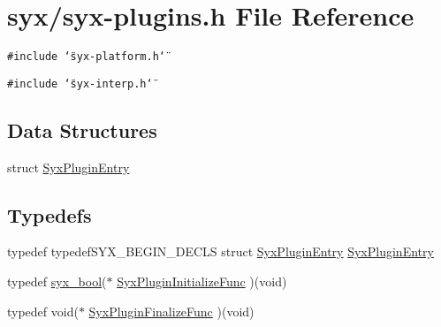 \hypertarget{syx-plugins_8h}{
\section{syx/syx-plugins.h File Reference}
\label{syx-plugins_8h}
}
{\tt \#include \char`\"{}syx-platform.h\char`\"{}}\par
{\tt \#include \char`\"{}syx-interp.h\char`\"{}}\par
\subsection*{Data Structures}
\begin{CompactItemize}
\item 
struct \hyperlink{struct_syx_plugin_entry}{SyxPluginEntry}
\end{CompactItemize}
\subsection*{Typedefs}
\begin{CompactItemize}
\item 
typedef typedefSYX\_\-BEGIN\_\-DECLS struct \hyperlink{struct_syx_plugin_entry}{SyxPluginEntry} \hyperlink{syx-plugins_8h_586263d5ec765059867a1a3378b96cd2}{SyxPluginEntry}
\item 
typedef \hyperlink{syx-types_8h_c6dc09b276b99fa1956364359139daab}{syx\_\-bool}($\ast$ \hyperlink{syx-plugins_8h_23d3afe78580c4501c61126a634cc427}{SyxPluginInitializeFunc} )(void)
\item 
typedef void($\ast$ \hyperlink{syx-plugins_8h_f831d8617aaf59d5ff5c167f613fa41c}{SyxPluginFinalizeFunc} )(void)
\end{CompactItemize}
